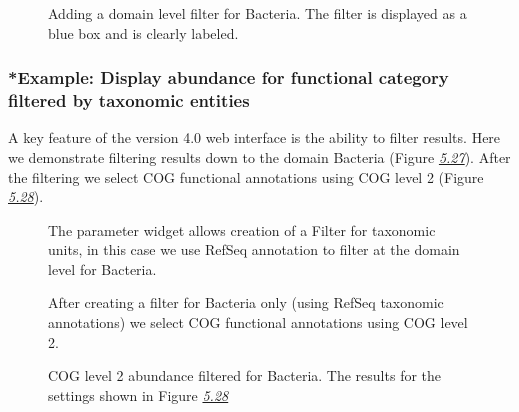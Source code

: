 \documentclass[letterpaper,10pt,english]{sphinxmanual}
\begin{document}
\begin{figure}[htbp]
\centering
\capstart

\noindent{}
\caption{Adding a domain level filter for Bacteria. The filter is displayed as
a blue box and is clearly labeled.}\label{\detokenize{user_manual:fig-v4-analysis-page-domain-filter}}\end{figure}


\subsubsection{*Example: Display abundance for functional category filtered by taxonomic entities}
\label{\detokenize{user_manual:example-display-abundance-for-functional-category-filtered-by-taxonomic-entities}}
A key feature of the version 4.0 web interface is the ability to filter
results. Here we demonstrate filtering results down to the domain
Bacteria (Figure
{\hyperref[\detokenize{user_manual:fig:v4-Analysis-page-filtering-for-Bacteria-settings}]{\emph{5.27}}}). After
the filtering we select COG functional annotations using COG level 2
(Figure
{\hyperref[\detokenize{user_manual:fig:v4-Analysis-page-COG-Level2-for-Bacteria-settings}]{\emph{5.28}}}).

\begin{figure}[htbp]
\centering
\capstart

\noindent{}
\caption{The parameter widget allows creation of a Filter for taxonomic units,
in this case we use RefSeq annotation to filter at the domain level
for Bacteria.}\label{\detokenize{user_manual:fig-v4-analysis-page-filtering-for-bacteria-settings}}\end{figure}

\begin{figure}[htbp]
\centering
\capstart

\noindent{}
\caption{After creating a filter for Bacteria only (using RefSeq taxonomic
annotations) we select COG functional annotations using COG level 2.}\label{\detokenize{user_manual:fig-v4-analysis-page-cog-level2-for-bacteria-settings}}\end{figure}

\begin{figure}[htbp]
\centering
\capstart

\noindent{}
\caption{COG level 2 abundance filtered for Bacteria. The results for the
settings shown in Figure
{\hyperref[\detokenize{user_manual:fig:v4-Analysis-page-COG-Level2-for-Bacteria-settings}]{\emph{5.28}}}}\label{\detokenize{user_manual:fig-v4-analysis-page-cog-level2-for-bacteria-results}}\end{figure}
\end{document}
